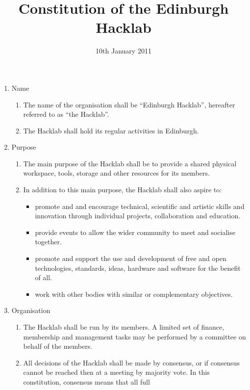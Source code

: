 \documentclass{article}
\title{Constitution of the Edinburgh Hacklab}
\date{10th January 2011}
\begin{document}
\maketitle
{}
\begin{enumerate}
  \item Name
    \begin{enumerate}
      \item The name of the organisation shall be ``Edinburgh
        Hacklab'', hereafter referred to as ``the Hacklab''.
      \item The Hacklab shall hold its regular activities in Edinburgh.
    \end{enumerate} %
  \item Purpose
    \begin{enumerate}
    \item The main purpose of the Hacklab shall be to provide a shared
      physical workspace, tools, storage and other resources for its
      members.
      \item In addition to this main purpose, the Hacklab shall also aspire to:
        \begin{itemize}
        \item promote and and encourage technical, scientific and
          artistic skills and innovation through individual projects,
          collaboration and education.
        \item provide events to allow the wider community to meet and
          socialise together. 
          \item promote and support the use and development of free
            and open technologies, standards, ideas, hardware and
            software for the benefit of all.
          \item work with other bodies with similar or complementary
            objectives.
        \end{itemize}
    \end{enumerate} %
  \item Organisation
    \begin{enumerate}
    \item The Hacklab shall be run by its members. A limited set of
      finance, membership and management tasks may be performed by a
      committee on behalf of the members.
    \item All decisions of the Hacklab shall be made by consensus, or
      if consensus cannot be reached then at a meeting by majority
      vote. In this constitution, consensus means that all full

\end{enumerate}
\end{enumerate}
\end{document}
